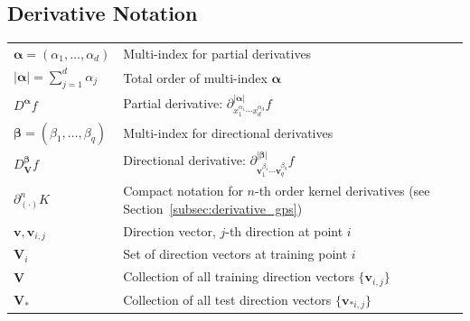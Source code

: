 \documentclass[12pt]{article}
\begin{document}
	\subsection*{Derivative Notation}
	\begin{tabular}{@{}l l@{}}
		$\boldsymbol{\alpha} = (\alpha_1, \ldots, \alpha_d)$ & Multi-index for partial derivatives \\
		$|\boldsymbol{\alpha}| = \sum_{j=1}^{d} \alpha_j$ & Total order of multi-index $\boldsymbol{\alpha}$ \\
		$D^{\boldsymbol{\alpha}} f$ & Partial derivative: $\partial^{|\boldsymbol{\alpha}|}_{x_1^{\alpha_1} \cdots x_d^{\alpha_d}} f$ \\
		$\boldsymbol{\beta} = (\beta_1, \ldots, \beta_q)$ & Multi-index for directional derivatives \\
		$D_{\mathbf{V}}^{\boldsymbol{\beta}} f$ & Directional derivative: $\partial^{|\boldsymbol{\beta}|}_{\mathbf{v}_1^{\beta_1} \cdots \mathbf{v}_q^{\beta_q}} f$ \\
		$\partial^n_{(\cdot)} K$ & Compact notation for $n$-th order kernel derivatives (see Section~\ref{subsec:derivative_gps}) \\
		$\mathbf{v}, \mathbf{v}_{i,j}$ & Direction vector, $j$-th direction at point $i$ \\
		$\mathbf{V}_i$ & Set of direction vectors at training point $i$ \\
		$\mathbf{V}$ & Collection of all training direction vectors $\{\mathbf{v}_{i,j}\}$ \\
		$\mathbf{V}_*$ & Collection of all test direction vectors $\{\mathbf{v}_{*i,j}\}$ \\
	\end{tabular}
	
\end{document}
